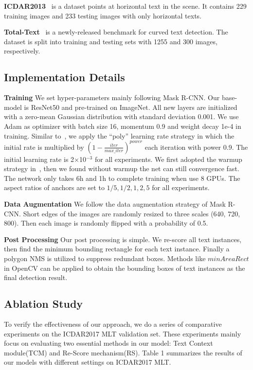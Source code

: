 \documentclass[letterpaper]{article} \usepackage{aaai19}  \usepackage{times}  \usepackage{helvet}  \usepackage{courier}  \usepackage{url}  \usepackage{graphicx}
\begin{document}
\textbf{ICDAR2013}~\cite{karatzas2013icdar} is a dataset points at horizontal text in the scene. It contains 229 training images and 233 testing images with only horizontal texts. 


\textbf{Total-Text}~\cite{ch2017total} is a newly-released benchmark for curved text detection. 
The dataset is split into training and testing sets with 1255 and 300 images, respectively.

\subsection{Implementation Details}
\textbf{Training} We set hyper-parameters mainly following Mask R-CNN. Our base-model is ResNet50 and pre-trained on ImageNet. All new layers are initialized with a zero-mean Gaussian distribution with standard deviation 0.001. We use Adam as optimizer with batch size 16, momentum 0.9 and weight decay 1e-4 in training. Similar to~\cite{yu2018bisenet}, we apply the ``poly'' learning rate strategy in which the initial rate is multiplied by $(1 - \frac{iter}{max\_iter})^{power}$ each iteration with power 0.9. The initial learning rate is 
2$\times$10$^{-3}$ for all experiments. We first adopted the warmup strategy in~\cite{peng2017megdet}, then we found without warmup the net can still convergence fast. The network only takes 6h and 1h to complete training when use 8 GPUs. The aspect ratios of anchors are set to $1/5, 1/2, 1, 2, 5$ for all experiments.

\textbf{Data Augmentation} 
We follow the data augmentation strategy of Mask R-CNN. Short edges of the images are randomly resized to three scales (640, 720, 800). Then each image is randomly flipped with a probability of 0.5.

\textbf{Post Processing}
Our post processing is simple. We re-score all text instances, then find the minimum bounding rectangle for each text instance.  Finally a polygon NMS is utilized to suppress redundant boxes.
Methods like $minAreaRect$ in OpenCV can be applied to obtain the bounding boxes of text instances as the final detection result.


\subsection{Ablation Study}
To verify the effectiveness of our approach, we do a series of comparative experiments on the ICDAR2017 MLT validation set. 
These experiments mainly focus on evaluating two essential methods in our model: Text Context module(TCM) and Re-Score mechanism(RS).
Table 1 summarizes the results of our models with different settings on ICDAR2017 MLT.
\end{document}
